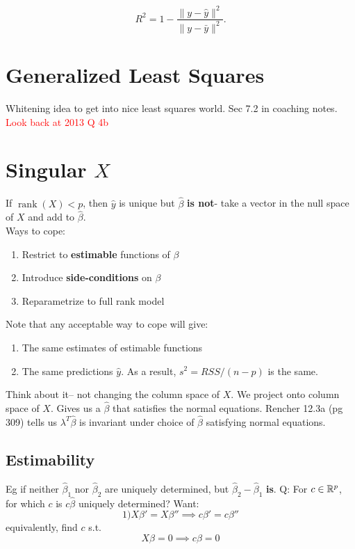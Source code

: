 \documentclass{article}
\newcommand\myworries[1]{\textcolor{red}{#1}}
\newcommand{\rank}{\operatorname{rank}}
\begin{document}
\begin{definition}[$R^2$]
    $$R^2 = 1 - \frac{\|y - \hat y\|^2}{\| y - \bar y\|^2}.$$
\end{definition}

\section{Generalized Least Squares}
Whitening idea to get into nice least squares world. Sec 7.2 in coaching notes. \myworries{Look back at 2013 Q 4b}
\section{Singular $X$}
If $\rank(X)<p$, then $\hat y$ is unique but $\hat \beta$ \textbf{is not}- take a vector in the null space of $X$ and add to $\hat \beta$. \\
Ways to cope:
\begin{enumerate}
    \item Restrict to \textbf{estimable} functions of $\beta$
    \item Introduce \textbf{side-conditions} on $\beta$
    \item Reparametrize to full rank model

\end{enumerate}
Note that any acceptable way to cope will give:
\begin{enumerate}
	\item The same estimates of estimable functions
	\item The same predictions $\hat y$. As a result, $s^2 = RSS/(n-p)$ is the same. 
\end{enumerate}
Think about it-- not changing the column space of $X$. We project onto column space of $X$. Gives us a $\hat \beta$ that satisfies the normal equations. Rencher 12.3a (pg 309) tells us $\lambda^T \hat \beta$ is invariant under choice of $\hat \beta$ satisfying normal equations. 
\subsection{Estimability}
Eg if neither $\hat \beta_1$ nor $\hat \beta_2$ are uniquely determined, but $\hat \beta_2 - \hat \beta_1$ \textbf{is}. Q: For $c\in \mathbb R^p$, for which $c$ is $c\hat \beta$ uniquely determined?  Want:
$$1) X\beta' = X\beta '' \implies c\beta' = c\beta'' $$
equivalently, find $c$ s.t.
$$X\beta = 0 \implies c\beta = 0$$
\end{document}
